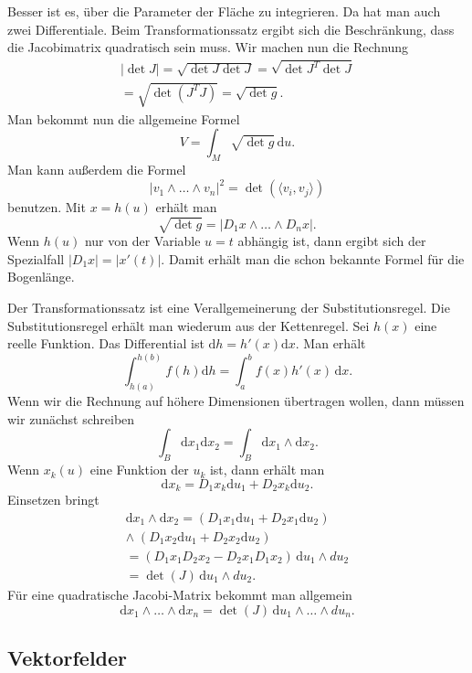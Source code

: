 \documentclass[a4paper,10pt,fleqn,twocolumn,twoside]{article}
\begin{document}
Besser ist es, über die Parameter der Fläche zu integrieren.
Da hat man auch zwei Differentiale. Beim Transformationssatz ergibt
sich die Beschränkung, dass die Jacobimatrix quadratisch sein muss.
Wir machen nun die Rechnung
\begin{gather*}
|{\det J}| = \sqrt{\det J\det J}
= \sqrt{\det J^T\det J}\\
= \sqrt{\det(J^TJ)} = \sqrt{\det g}.
\end{gather*}
Man bekommt nun die allgemeine Formel
\[V = \int_M \sqrt{\det g}\,\mathrm du.\]
Man kann außerdem die Formel
\[|v_1\wedge\ldots\wedge v_n|^2 = \det(\langle v_i,v_j\rangle)\]
benutzen. Mit $x=h(u)$ erhält man
\[\sqrt{\det g} = |D_1 x\wedge\ldots\wedge D_n x|.\]
Wenn $h(u)$ nur von der Variable $u=t$ abhängig ist, dann ergibt
sich der Spezialfall $|D_1 x| = |x'(t)|$. Damit erhält man die schon
bekannte Formel für die Bogenlänge.

Der Transformationssatz ist eine Verallgemeinerung der
Substitutionsregel. Die Substitutionsregel erhält man wiederum aus
der Kettenregel. Sei $h(x)$ eine reelle Funktion.
Das Differential ist $\mathrm dh = h'(x)\mathrm dx$. Man erhält
\[\int_{h(a)}^{h(b)} f(h)\mathrm dh = \int_a^b f(x) h'(x)\,\mathrm dx.\]
Wenn wir die Rechnung auf höhere Dimensionen übertragen wollen, dann
müssen wir zunächst schreiben
\[\int_B \mathrm dx_1\mathrm dx_2 = \int_B \mathrm dx_1\wedge\mathrm dx_2.\]
Wenn $x_k(u)$ eine Funktion der $u_k$ ist, dann erhält man
\[\mathrm dx_k = D_1x_k\mathrm du_1+D_2x_k\mathrm du_2.\]
Einsetzen bringt
\begin{gather*}
\mathrm dx_1\wedge\mathrm dx_2
= (D_1x_1\mathrm du_1+D_2x_1\mathrm du_2)\\
\wedge\; (D_1x_2\mathrm du_1+D_2x_2\mathrm du_2)\\
= (D_1 x_1 D_2 x_2 - D_2 x_1 D_1 x_2)\,\mathrm du_1\wedge du_2\\
= \det(J)\,\mathrm du_1\wedge du_2.
\end{gather*}
Für eine quadratische Jacobi-Matrix bekommt man allgemein
\[\mathrm dx_1\wedge\ldots\wedge\mathrm dx_n
= \det(J)\,\mathrm du_1\wedge\ldots\wedge du_n.\]


\subsection{Vektorfelder}
\end{document}
